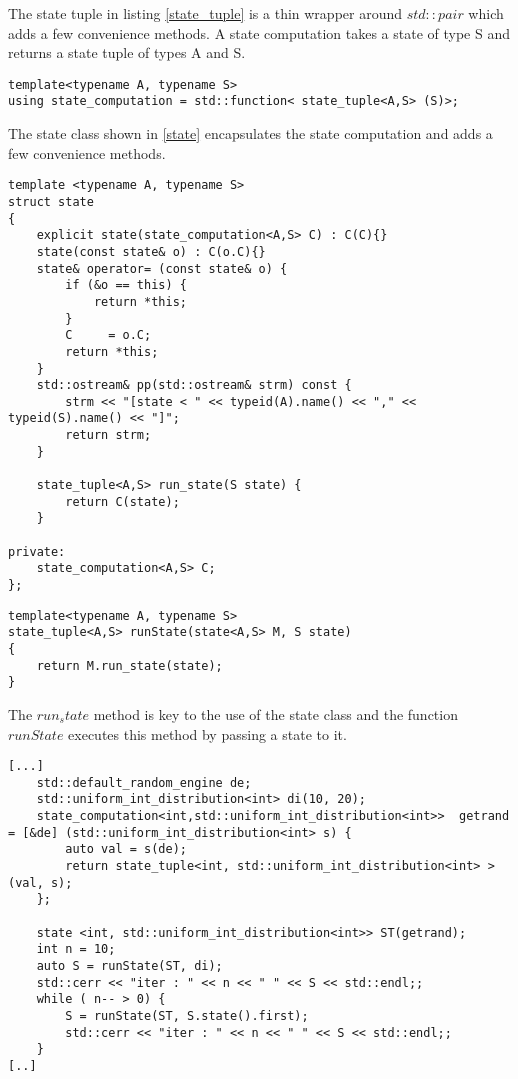 \documentclass[12pt,fleqn]{article}
\begin{document}
The state tuple in listing \ref{state_tuple} is a thin wrapper around $std::pair$ which adds a few convenience methods.
A state computation takes a state of type S and returns a state tuple of types A and S.

%
%
%
\begin{minipage}{\linewidth}
\begin{lstlisting}[caption=state computation albel=state_comp]
template<typename A, typename S>
using state_computation = std::function< state_tuple<A,S> (S)>;
\end{lstlisting}
\end{minipage}
%
%
%
The state class shown in \ref{state} encapsulates the state computation and adds a few convenience methods.

%
%
%
\begin{minipage}{\linewidth}
\begin{lstlisting}[caption=state, label=state]
template <typename A, typename S>
struct state 
{
	explicit state(state_computation<A,S> C) : C(C){}
	state(const state& o) : C(o.C){}
	state& operator= (const state& o) {
		if (&o == this) {
			return *this;
		}
		C     = o.C;
		return *this;
	} 
	std::ostream& pp(std::ostream& strm) const {
		strm << "[state < " << typeid(A).name() << "," << typeid(S).name() << "]";
		return strm;
	}

	state_tuple<A,S> run_state(S state) {
		return C(state);
	}
	
private:
	state_computation<A,S> C;
};
\end{lstlisting}
\end{minipage}
%
%
%


%
%
%
\begin{minipage}{\linewidth}
\begin{lstlisting}[caption=runState, label=runstate]
template<typename A, typename S>
state_tuple<A,S> runState(state<A,S> M, S state)
{
	return M.run_state(state);
}
\end{lstlisting}
\end{minipage}
%
%
%

%
%
The $run_state$ method is key to the use of the state class and the function $runState$ executes this method by passing a state to it.

%
%
%
\begin{minipage}{\linewidth}
\begin{lstlisting}[caption=example of the use of the state class, label=stateexample]
[...]
	std::default_random_engine de;
	std::uniform_int_distribution<int> di(10, 20);
	state_computation<int,std::uniform_int_distribution<int>>  getrand = [&de] (std::uniform_int_distribution<int> s) {
		auto val = s(de);
		return state_tuple<int, std::uniform_int_distribution<int> >(val, s);
	}; 

	state <int, std::uniform_int_distribution<int>> ST(getrand);
	int n = 10;
	auto S = runState(ST, di);
	std::cerr << "iter : " << n << " " << S << std::endl;;
	while ( n-- > 0) {
		S = runState(ST, S.state().first);
		std::cerr << "iter : " << n << " " << S << std::endl;;
	}
[..]
\end{lstlisting}
\end{minipage}
%
%
%
\end{document}
